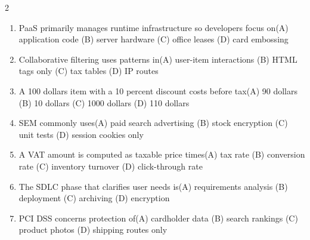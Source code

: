 \documentclass[a4paper]{article}
\begin{document}
\begin{multicols*}{2}
\begin{enumerate}
\item PaaS primarily manages runtime infrastructure so developers focus on\newline\hspace*{0.6em}(A) application code \quad (B) server hardware \newline\hspace*{0.6em}(C) office leases \quad (D) card embossing
\item Collaborative filtering uses patterns in\newline\hspace*{0.6em}(A) user-item interactions \quad (B) HTML tags only \newline\hspace*{0.6em}(C) tax tables \quad (D) IP routes
\item A 100 dollars item with a 10 percent discount costs before tax\newline\hspace*{0.6em}(A) 90 dollars \quad (B) 10 dollars \newline\hspace*{0.6em}(C) 1000 dollars \quad (D) 110 dollars
\item SEM commonly uses\newline\hspace*{0.6em}(A) paid search advertising \quad (B) stock encryption \newline\hspace*{0.6em}(C) unit tests \quad (D) session cookies only
\item A VAT amount is computed as taxable price times\newline\hspace*{0.6em}(A) tax rate \quad (B) conversion rate \newline\hspace*{0.6em}(C) inventory turnover \quad (D) click-through rate
\item The SDLC phase that clarifies user needs is\newline\hspace*{0.6em}(A) requirements analysis \quad (B) deployment \newline\hspace*{0.6em}(C) archiving \quad (D) encryption
\item PCI DSS concerns protection of\newline\hspace*{0.6em}(A) cardholder data \quad (B) search rankings \newline\hspace*{0.6em}(C) product photos \quad (D) shipping routes only

\end{enumerate}
\end{multicols*}
\end{document}
